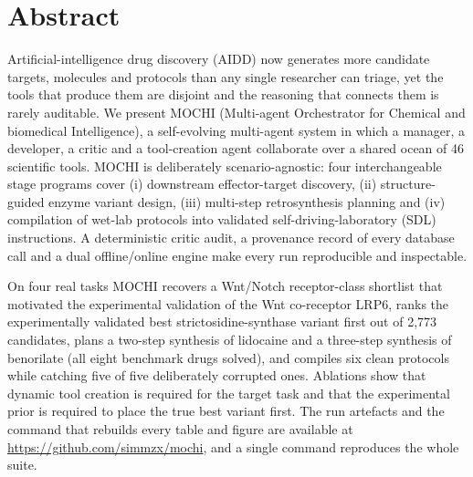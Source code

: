 \chapter{Abstract}

Artificial-intelligence drug discovery (AIDD) now generates more candidate targets, molecules and protocols than any single researcher can triage, yet the tools that produce them are disjoint and the reasoning that connects them is rarely auditable. We present MOCHI (Multi-agent Orchestrator for Chemical and biomedical Intelligence), a self-evolving multi-agent system in which a manager, a developer, a critic and a tool-creation agent collaborate over a shared ocean of 46 scientific tools. MOCHI is deliberately scenario-agnostic: four interchangeable stage programs cover (i) downstream effector-target discovery, (ii) structure-guided enzyme variant design, (iii) multi-step retrosynthesis planning and (iv) compilation of wet-lab protocols into validated self-driving-laboratory (SDL) instructions. A deterministic critic audit, a provenance record of every database call and a dual offline/online engine make every run reproducible and inspectable.

On four real tasks MOCHI recovers a Wnt/Notch receptor-class shortlist that motivated the experimental validation of the Wnt co-receptor LRP6, ranks the experimentally validated best strictosidine-synthase variant first out of 2,773 candidates, plans a two-step synthesis of lidocaine and a three-step synthesis of benorilate (all eight benchmark drugs solved), and compiles six clean protocols while catching five of five deliberately corrupted ones. Ablations show that dynamic tool creation is required for the target task and that the experimental prior is required to place the true best variant first. The run artefacts and the command that rebuilds every table and figure are available at \url{https://github.com/simmzx/mochi}, and a single command reproduces the whole suite.

